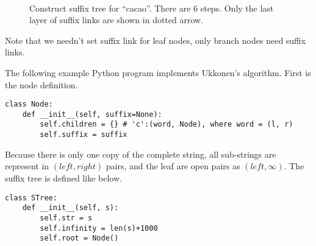 \documentclass{article}
\begin{document}
\begin{figure}[htbp]
  \centering
   \\
  \caption{Construct suffix tree for ``cacao''. There are 6 steps. Only the last layer of suffix links are shown in dotted arrow.}
  \label{fig:cons-stree-cacao}
\end{figure}

Note that we needn't set suffix link for leaf nodes, only branch nodes
need suffix links.

The following example Python program implements Ukkonen's algorithm.
First is the node definition.

\lstset{language=Python}
\begin{lstlisting}
class Node:
    def __init__(self, suffix=None):
        self.children = {} # 'c':(word, Node), where word = (l, r)
        self.suffix = suffix
\end{lstlisting}

Because there is only one copy of the complete string, all sub-strings
are represent in $(left, right)$ pairs, and the leaf are open pairs
as $(left, \infty)$. The suffix tree is defined like below.

\begin{lstlisting}
class STree:
    def __init__(self, s):
        self.str = s
        self.infinity = len(s)+1000
        self.root = Node()
\end{lstlisting}
\end{document}
